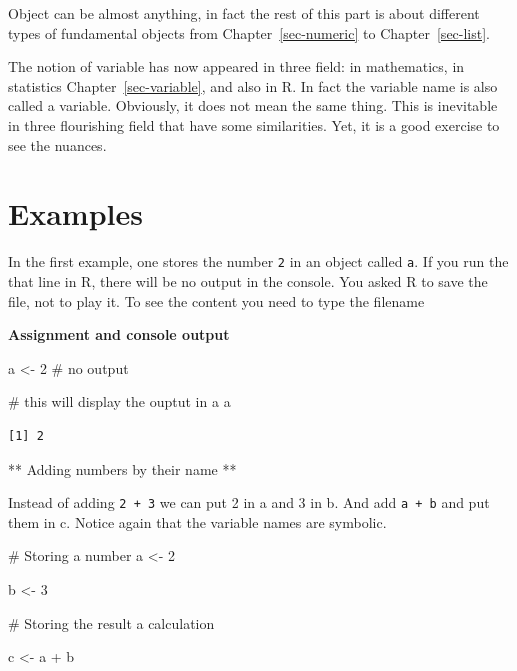 \documentclass[
  letterpaper,
  DIV=11,
  numbers=noendperiod]{scrreprt}
\newenvironment{Shaded}{\begin{snugshade}}{\end{snugshade}}
\newcommand{\CommentTok}[1]{\textcolor[rgb]{0.37,0.37,0.37}{#1}}
\newcommand{\DecValTok}[1]{\textcolor[rgb]{0.68,0.00,0.00}{#1}}
\newcommand{\NormalTok}[1]{\textcolor[rgb]{0.00,0.23,0.31}{#1}}
\newcommand{\OtherTok}[1]{\textcolor[rgb]{0.00,0.23,0.31}{#1}}
\newcommand{\SpecialCharTok}[1]{\textcolor[rgb]{0.37,0.37,0.37}{#1}}
\begin{document}
Object can be almost anything, in fact the rest of this part is about
different types of fundamental objects from Chapter~\ref{sec-numeric} to
Chapter~\ref{sec-list}.

The notion of variable has now appeared in three field: in mathematics,
in statistics Chapter~\ref{sec-variable}, and also in R. In fact the
variable name is also called a variable. Obviously, it does not mean the
same thing. This is inevitable in three flourishing field that have some
similarities. Yet, it is a good exercise to see the nuances.

\section*{Examples}\label{examples-27}


In the first example, one stores the number \texttt{2} in an object
called \texttt{a}. If you run the that line in R, there will be no
output in the console. You asked R to save the file, not to play it. To
see the content you need to type the filename

\textbf{Assignment and console output}

\begin{Shaded}
\begin{Highlighting}[]
\NormalTok{a }\OtherTok{\textless{}{-}} \DecValTok{2}
\CommentTok{\# no output}

\CommentTok{\# this will display the ouptut in a}
\NormalTok{a}
\end{Highlighting}
\end{Shaded}

\begin{verbatim}
[1] 2
\end{verbatim}

** Adding numbers by their name **

Instead of adding \texttt{2\ +\ 3} we can put 2 in a and 3 in b. And add
\texttt{a\ +\ b} and put them in c. Notice again that the variable names
are symbolic.

\begin{Shaded}
\begin{Highlighting}[]
\CommentTok{\# Storing a number}
\NormalTok{a }\OtherTok{\textless{}{-}} \DecValTok{2}

\NormalTok{b }\OtherTok{\textless{}{-}} \DecValTok{3}

\CommentTok{\# Storing the result a calculation}

\NormalTok{c }\OtherTok{\textless{}{-}}\NormalTok{ a }\SpecialCharTok{+}\NormalTok{ b}
\end{Highlighting}
\end{Shaded}
\end{document}
